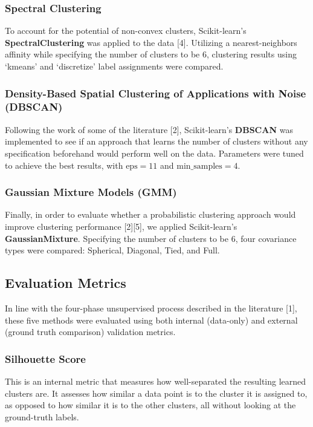 \documentclass[12pt]{IEEEtran}
\begin{document}
\subsubsection{Spectral Clustering} To account for the potential of non-convex clusters, Scikit-learn's \textbf{SpectralClustering} was applied to the data [4]. Utilizing a nearest-neighbors affinity while specifying the number of clusters to be 6, clustering results using `kmeans' and `discretize' label assignments were compared.

\subsubsection{Density-Based Spatial Clustering of Applications with Noise (DBSCAN)} Following the work of some of the literature [2], Scikit-learn's \textbf{DBSCAN} was implemented to see if an approach that learns the number of clusters without any specification beforehand would perform well on the data. Parameters were tuned to achieve the best results, with $\text{eps}=11$ and $\text{min\_samples}=4$. 

\subsubsection{Gaussian Mixture Models (GMM)} Finally, in order to evaluate whether a probabilistic clustering approach would improve clustering performance [2][5], we applied Scikit-learn's \textbf{GaussianMixture}. Specifying the number of clusters to be 6, four covariance types were compared: Spherical, Diagonal, Tied, and Full.

\subsection{Evaluation Metrics}
In line with the four-phase unsupervised process described in the literature [1], these five methods were evaluated using both internal (data-only) and external (ground truth comparison) validation metrics.

\subsubsection{Silhouette Score} This is an internal metric that measures how well-separated the resulting learned clusters are. It assesses how similar a data point is to the cluster it is assigned to, as opposed to how similar it is to the other clusters, all without looking at the ground-truth labels. 
\end{document}

